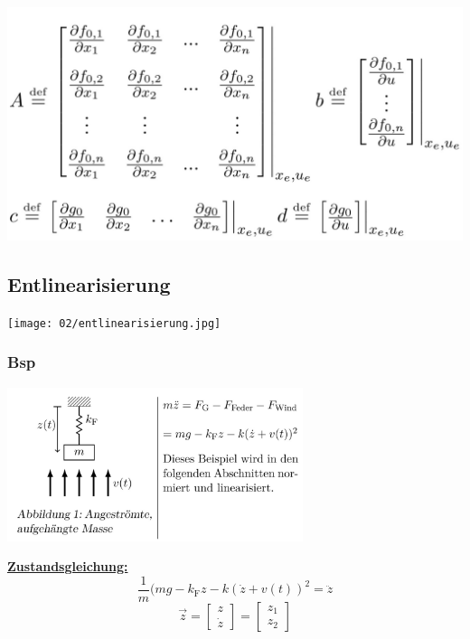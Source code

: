     \begin{center}
        \includegraphics[width=\linewidth]{images/01/01_Statespace.jpg}
    \end{center}
    
    \subsection{Entlinearisierung}
        \begin{center}
            \texttt{[image: 02/entlinearisierung.jpg]}
        \end{center}
    
    \subsubsection{Bsp}
        \includegraphics[width=\linewidth,     height=45mm]{images/01/01_bsp.jpg}
        \vspace{-6mm}
        
        \textbf{\underline{Zustandsgleichung:}}
            \[\frac{1}{m}(mg-k_\textrm{F}z-k(\dot{z}+v(t))^2 = \ddot{z}\]
	        \[\vec{z} = \begin{bmatrix} z\\ \dot{z} \end{bmatrix} = \begin{bmatrix} z_1\\ z_2 \end{bmatrix}\]
	        
